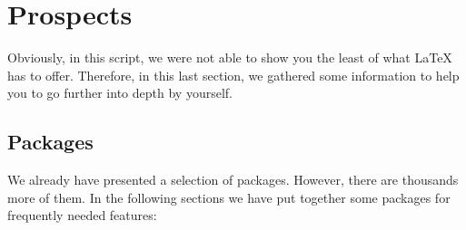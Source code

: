 \chapter{Prospects}
\label{sec:prospects}

Obviously, in this script, we were not able to show you the least of what \LaTeX{} has to offer. 
Therefore, in this last section, we gathered some information to help you to go further into depth by yourself.

\section{Packages}

We already have presented a selection of packages. However, there are thousands more of them. In the following sections we have put together some packages for frequently needed features: 

